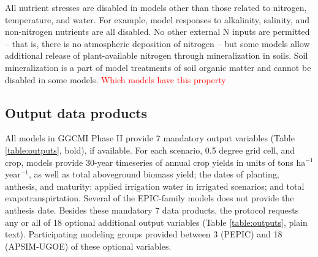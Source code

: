 \documentclass[gmd, manuscript]{copernicus} %
\begin{document}
All nutrient stresses are disabled in models other than those related to nitrogen, temperature, and water. 
For example, model responses to alkalinity, salinity, and non-nitrogen nutrients are all disabled. 
No other external N inputs are permitted -- that is, there is no atmospheric deposition of nitrogen --  but some models allow additional release of plant-available nitrogen through mineralization in soils. 
Soil mineralization is a part of model treatments of soil organic matter and cannot be disabled in some models. 
\textcolor{red}{Which models have this property} 

\subsection{Output data products}
All models in GGCMI Phase II provide 7 mandatory output variables (Table \ref{table:outputs}, bold), if available. 
For each scenario, 0.5 degree grid cell, and crop, models provide 30-year timeseries of annual crop yields in units of tons ha$^{-1}$ year$^{-1}$, as well as total aboveground biomass yield; the dates of planting, anthesis, and maturity; applied irrigation water in irrigated scenarios; and total evapotranspirtation. 
Several of the EPIC-family models does not provide the anthesis date.
Besides these mandatory 7 data products, the protocol requests any or all of 18 optional additional output variables (Table \ref{table:outputs}, plain text).
Participating modeling groups provided between 3 (PEPIC) and 18 (APSIM-UGOE) of these optional variables. 
\end{document}
